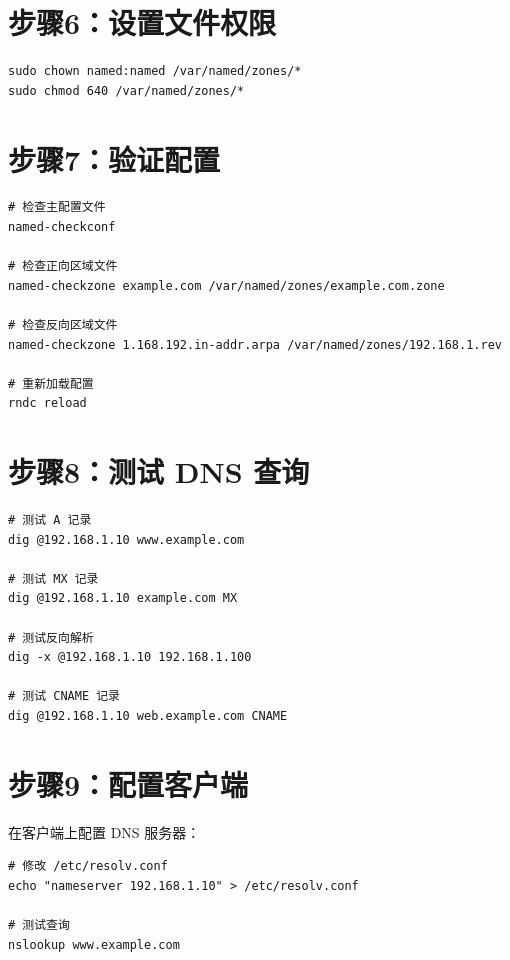 \documentclass[12pt,UTF8]{ctexbook}
\begin{document}
\section{步骤6：设置文件权限}
\label{sec:practice_step6}

\begin{verbatim}
sudo chown named:named /var/named/zones/*
sudo chmod 640 /var/named/zones/*
\end{verbatim}

\section{步骤7：验证配置}
\label{sec:practice_step7}

\begin{verbatim}
# 检查主配置文件
named-checkconf

# 检查正向区域文件
named-checkzone example.com /var/named/zones/example.com.zone

# 检查反向区域文件
named-checkzone 1.168.192.in-addr.arpa /var/named/zones/192.168.1.rev

# 重新加载配置
rndc reload
\end{verbatim}

\section{步骤8：测试 DNS 查询}
\label{sec:practice_step8}

\begin{verbatim}
# 测试 A 记录
dig @192.168.1.10 www.example.com

# 测试 MX 记录
dig @192.168.1.10 example.com MX

# 测试反向解析
dig -x @192.168.1.10 192.168.1.100

# 测试 CNAME 记录
dig @192.168.1.10 web.example.com CNAME
\end{verbatim}

\section{步骤9：配置客户端}
\label{sec:practice_step9}

在客户端上配置 DNS 服务器：

\begin{verbatim}
# 修改 /etc/resolv.conf
echo "nameserver 192.168.1.10" > /etc/resolv.conf

# 测试查询
nslookup www.example.com
\end{verbatim}

\backmatter
\end{document}

